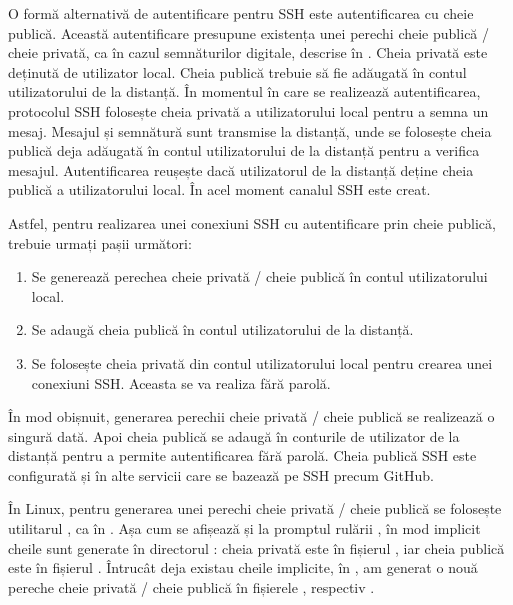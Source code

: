 O formă alternativă de autentificare pentru SSH este autentificarea cu cheie publică.
Această autentificare presupune existența unei perechi cheie publică / cheie privată, ca în cazul semnăturilor digitale, descrise în .
Cheia privată este deținută de utilizator local.
Cheia publică trebuie să fie adăugată în contul utilizatorului de la distanță.
În momentul în care se realizează autentificarea, protocolul SSH folosește cheia privată a utilizatorului local pentru a semna un mesaj.
Mesajul și semnătură sunt transmise la distanță, unde se folosește cheia publică deja adăugată în contul utilizatorului de la distanță pentru a verifica mesajul.
Autentificarea reușește dacă utilizatorul de la distanță deține cheia publică a utilizatorului local.
În acel moment canalul SSH este creat.

Astfel, pentru realizarea unei conexiuni SSH cu autentificare prin cheie publică, trebuie urmați pașii următori:
\begin{enumerate}
  \item Se generează perechea cheie privată / cheie publică în contul utilizatorului local.
  \item Se adaugă cheia publică în contul utilizatorului de la distanță.
  \item Se folosește cheia privată din contul utilizatorului local pentru crearea unei conexiuni SSH.
    Aceasta se va realiza fără parolă.
\end{enumerate}

În mod obișnuit, generarea perechii cheie privată / cheie publică se realizează o singură dată.
Apoi cheia publică se adaugă în conturile de utilizator de la distanță pentru a permite autentificarea fără parolă.
Cheia publică SSH este configurată și în alte servicii care se bazează pe SSH precum GitHub.

În Linux, pentru generarea unei perechi cheie privată / cheie publică se folosește utilitarul , ca în .
Așa cum se afișează și la promptul rulării , în mod implicit cheile sunt generate în directorul : cheia privată este în fișierul , iar cheia publică este în fișierul .
Întrucât deja existau cheile implicite, în , am generat o nouă pereche cheie privată / cheie publică în fișierele , respectiv .

